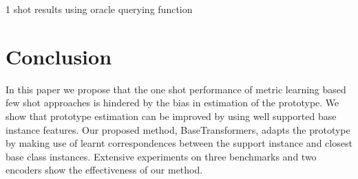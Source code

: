 \documentclass{bmvc2k}
\begin{document}
\begin{table}[]
\begin{minipage}{0.5\linewidth}
\caption{1 shot results using oracle querying function}
\label{table:oracle}

\end{minipage}\hspace{0.01\linewidth}\begin{minipage}{0.5\linewidth}

\caption{Ablation of various components of BaseTransformer}
\label{table:ablation}
\centering
{}
\end{minipage}
\end{table}

\section{Conclusion}

In this paper we propose that the one shot performance of metric learning based few shot approaches is hindered by the bias in estimation of the prototype. We show that prototype estimation can be improved by using well supported base instance features. Our proposed method, BaseTransformers, adapts the prototype by making use of learnt correspondences between the support instance and closest base class instances. Extensive experiments on three benchmarks and two encoders show the effectiveness of our method.
\end{document}

